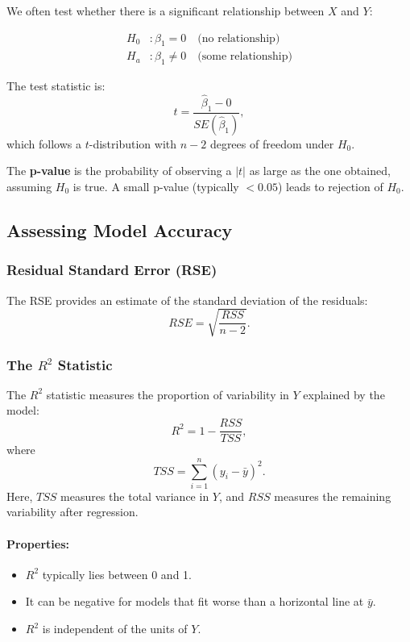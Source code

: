 We often test whether there is a significant relationship between \(X\) and \(Y\):

\[
\begin{aligned}
H_0 &: \beta_1 = 0 \quad \text{(no relationship)} \\
H_a &: \beta_1 \neq 0 \quad \text{(some relationship)}
\end{aligned}
\]

The test statistic is:
\[
t = \frac{\hat{\beta}_1 - 0}{SE(\hat{\beta}_1)},
\]
which follows a \(t\)-distribution with \(n - 2\) degrees of freedom under \(H_0\).

The \textbf{p-value} is the probability of observing a \( |t| \) as large as the one obtained, assuming \(H_0\) is true.  
A small p-value (typically \(< 0.05\)) leads to rejection of \(H_0\).

\subsection{Assessing Model Accuracy}

\subsubsection{Residual Standard Error (RSE)}

The RSE provides an estimate of the standard deviation of the residuals:
\[
RSE = \sqrt{\frac{RSS}{n - 2}}.
\]

\subsubsection{The \(R^2\) Statistic}

The \(R^2\) statistic measures the proportion of variability in \(Y\) explained by the model:
\[
R^2 = 1 - \frac{RSS}{TSS},
\]
where
\[
TSS = \sum_{i=1}^{n} (y_i - \bar{y})^2.
\]
Here, \(TSS\) measures the total variance in \(Y\), and \(RSS\) measures the remaining variability after regression.

\paragraph{Properties:}
\begin{itemize}
    \item \(R^2\) typically lies between 0 and 1.
    \item It can be negative for models that fit worse than a horizontal line at \(\bar{y}\).
    \item \(R^2\) is independent of the units of \(Y\).
\end{itemize}


